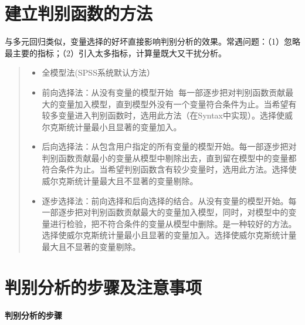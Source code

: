 \documentclass[]{ctexbook}
\providecommand{\tightlist}{%
  \setlength{\itemsep}{0pt}\setlength{\parskip}{0pt}}
\begin{document}
\hypertarget{ux5efaux7acbux5224ux522bux51fdux6570ux7684ux65b9ux6cd5}{%
\section{建立判别函数的方法}\label{ux5efaux7acbux5224ux522bux51fdux6570ux7684ux65b9ux6cd5}}

与多元回归类似，变量选择的好坏直接影响判别分析的效果。常遇问题：（1）忽略最主要的指标；（2）引入太多指标，计算量既大又干扰分析。

\begin{quote}
\begin{itemize}
\tightlist
\item
  全模型法(SPSS系统默认方法）
\item
  前向选择法：从没有变量的模型开始 每一部逐步把对判别函数贡献最大的变量加入模型，直到模型外没有一个变量符合条件为止。当希望有较多变量进入判别函数时，选用此方法（在Syntax中实现）。选择使威尔克斯统计量最小且显著的变量加入。
\item
  后向选择法：从包含用户指定的所有变量的模型开始。每一部逐步把对判别函数贡献最小的变量从模型中剔除出去，直到留在模型中的变量都符合条件为止。当希望判别函数含有较少变量时，选用此方法。选择使威尔克斯统计量最大且不显著的变量剔除。
\item
  逐步选择法：前向选择和后向选择的结合。从没有变量的模型开始。每一部逐步把对判别函数贡献最大的变量加入模型，同时，对模型中的变量进行检验，把不符合条件的变量从模型中删除。是一种较好的方法。选择使威尔克斯统计量最小且显著的变量加入。选择使威尔克斯统计量最大且不显著的变量剔除。
\end{itemize}
\end{quote}

\hypertarget{ux5224ux522bux5206ux6790ux7684ux6b65ux9aa4ux53caux6ce8ux610fux4e8bux9879}{%
\section{判别分析的步骤及注意事项}\label{ux5224ux522bux5206ux6790ux7684ux6b65ux9aa4ux53caux6ce8ux610fux4e8bux9879}}

\textbf{判别分析的步骤}
\end{document}
